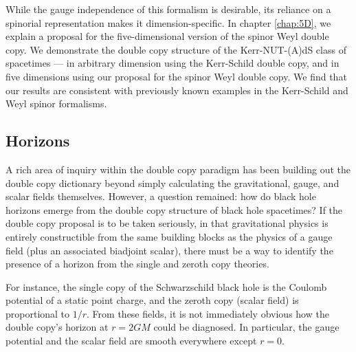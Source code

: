 While the gauge independence of this formalism is desirable, its reliance on a spinorial representation makes it
dimension-specific. In chapter \ref{chap:5D}, we explain a proposal for the five-dimensional version of the spinor Weyl
double copy. We demonstrate the double copy structure of the Kerr-NUT-(A)dS class of spacetimes --- in arbitrary
dimension using the Kerr-Schild double copy, and in five dimensions using our proposal for the spinor Weyl double
copy. We find that our results are consistent with previously known examples in the Kerr-Schild and Weyl spinor
formalisms.

\subsection{\texorpdfstring{Horizons }{Horizons }}


A rich area of inquiry within the double copy paradigm has been building out the double copy dictionary beyond simply
calculating the gravitational, gauge, and scalar fields themselves. However, a question remained: how do black hole
horizons emerge from the double copy structure of black hole spacetimes? If the double copy proposal is to be taken seriously, in that gravitational physics is entirely constructible from
the same building blocks as the physics of a gauge field (plus an associated biadjoint scalar), there must be a way to
identify the presence of a horizon from the single and zeroth copy theories.

For instance, the single copy of the Schwarzschild black hole is the Coulomb potential of a static point charge,
and the zeroth copy (scalar field) is proportional to $1 / r$. From these fields, it is not immediately obvious how
the double copy's horizon at $r = 2GM$ could be diagnosed. In particular, the gauge potential and the scalar field
are smooth everywhere except $r = 0$.

